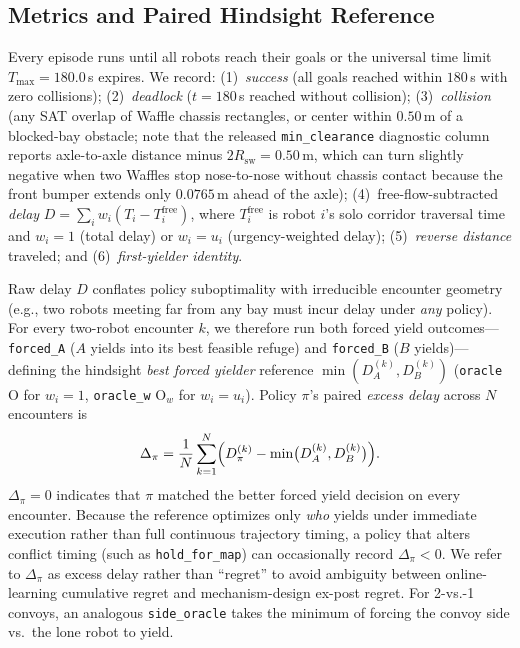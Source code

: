 \documentclass[letterpaper,journal]{IEEEtran}
\begin{document}
\subsection{Metrics and Paired Hindsight Reference}
Every episode runs until all robots reach their goals or the universal time limit $T_{\max}=180.0$\,s expires. We record: (1)~\emph{success} (all goals reached within $180$\,s with zero collisions); (2)~\emph{deadlock} ($t=180$\,s reached without collision); (3)~\emph{collision} (any SAT overlap of Waffle chassis rectangles, or center within $0.50$\,m of a blocked-bay obstacle; note that the released \texttt{min\_clearance} diagnostic column reports axle-to-axle distance minus $2R_{\mathrm{sw}}=0.50$\,m, which can turn slightly negative when two Waffles stop nose-to-nose without chassis contact because the front bumper extends only $0.0765$\,m ahead of the axle); (4)~free-flow-subtracted \emph{delay} $D = \sum_i w_i(T_i - T_i^{\mathrm{free}})$, where $T_i^{\mathrm{free}}$ is robot $i$'s solo corridor traversal time and $w_i=1$ (total delay) or $w_i=u_i$ (urgency-weighted delay); (5)~\emph{reverse distance} traveled; and (6)~\emph{first-yielder identity}.

Raw delay $D$ conflates policy suboptimality with irreducible encounter geometry (e.g., two robots meeting far from any bay must incur delay under \emph{any} policy). For every two-robot encounter $k$, we therefore run both forced yield outcomes---\texttt{forced\_A} ($A$ yields into its best feasible refuge) and \texttt{forced\_B} ($B$ yields)---defining the hindsight \emph{best forced yielder} reference $\min(D_A^{(k)}, D_B^{(k)})$ (\texttt{oracle} O for $w_i=1$, \texttt{oracle\_w} O$_w$ for $w_i=u_i$). Policy $\pi$'s paired \emph{excess delay} across $N$ encounters is
\begin{equation}
\Delta_\pi = \frac{1}{N}\sum_{k=1}^{N}\Bigl(D_\pi^{(k)} - \min\bigl(D_A^{(k)}, D_B^{(k)}\bigr)\Bigr).
\label{eq:excess}
\end{equation}
$\Delta_\pi=0$ indicates that $\pi$ matched the better forced yield decision on every encounter. Because the reference optimizes only \emph{who} yields under immediate execution rather than full continuous trajectory timing, a policy that alters conflict timing (such as \texttt{hold\_for\_map}) can occasionally record $\Delta_\pi<0$. We refer to $\Delta_\pi$ as excess delay rather than ``regret'' to avoid ambiguity between online-learning cumulative regret and mechanism-design ex-post regret. For 2-vs.-1 convoys, an analogous \texttt{side\_oracle} takes the minimum of forcing the convoy side vs.\ the lone robot to yield.
\end{document}
